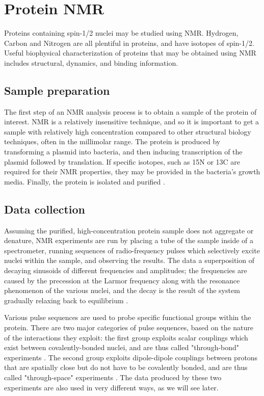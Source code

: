 \section{Protein NMR}

Proteins containing spin-1/2 nuclei may be studied using NMR.  Hydrogen, 
Carbon and Nitrogen are all plentiful in proteins, and have isotopes of 
spin-1/2.  Useful biophysical characterization of proteins that may be 
obtained using NMR includes structural, dynamics, and binding information.

\subsection*{Sample preparation}

The first step of an NMR analysis process is to obtain a sample of the protein
of interest.  NMR is a relatively insensitive technique, and so it is important
to get a sample with relatively high concentration compared to other structural
biology techniques, often in the millimolar range.  The protein is produced
by transforming a plasmid into bacteria, and then inducing transcription 
of the plasmid followed by translation.  If specific isotopes, such as 15N or 
13C are required for their NMR properties, they may be provided in the 
bacteria's growth media.  Finally, the protein is isolated and purified
\cite{derome1987modern}.

\subsection*{Data collection}

Assuming the purified, high-concentration protein sample does not aggregate
or denature, NMR experiments are run by placing a tube of the sample inside 
of a spectrometer, running sequences of radio-frequency pulses which selectively
excite nuclei within the sample, and observing the results.  The data a 
superposition of decaying sinusoids of different frequencies and amplitudes;
the frequencies are caused by the precession at the Larmor frequency along with
the resonance phenomenon of the various nuclei, and the decay is the result
of the system gradually relaxing back to equilibrium \cite{bloch1946nuclear}.

Various pulse sequences are used to probe specific functional groups within
the protein.  There are two major categories of pulse sequences, based on the
nature of the interactions they exploit: the first group exploits scalar 
couplings which exist between covalently-bonded nuclei, and are thus called 
"through-bond" experiments \cite{davis1985assignment}.  
The second group exploits dipole-dipole couplings
between protons that are spatially close but do not have to be covalently
bonded, and are thus called "through-space" experiments
\cite{solomon1955relaxation}.  The data produced by
these two experiments are also used in very different ways, as we will see
later.


